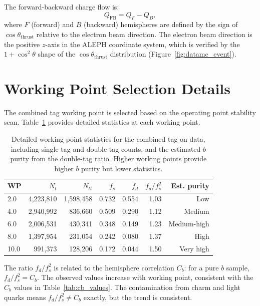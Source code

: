 \documentclass[11pt,a4paper]{article}
\begin{document}
The forward-backward charge flow is:
\begin{equation}
Q_\mathrm{FB} = Q_F - Q_B,
\label{eq:qfb_definition}
\end{equation}
where $F$ (forward) and $B$ (backward) hemispheres are defined by the sign of
$\cos\theta_\mathrm{thrust}$ relative to the electron beam direction. The electron
beam direction is the positive $z$-axis in the ALEPH coordinate system, which is
verified by the $1 + \cos^2\theta$ shape of the $\cos\theta_\mathrm{thrust}$
distribution (Figure~\ref{fig:datamc_event}).

\section{Working Point Selection Details}
\label{app:working_point}

The combined tag working point is selected based on the operating point stability
scan. Table~\ref{tab:wp_detail} provides detailed statistics at each working point.

\begin{table}[htbp]
\centering
\caption{Detailed working point statistics for the combined tag on data, including
single-tag and double-tag counts, and the estimated $b$ purity from the double-tag
ratio. Higher working points provide higher $b$ purity but lower statistics.}
\label{tab:wp_detail}
\begin{tabular}{lrrrrrr}
\toprule
WP & $N_t$ & $N_{tt}$ & $f_s$ & $f_d$ & $f_d/f_s^2$ & Est. purity \\
\midrule
2.0 & 4,223,810 & 1,598,458 & 0.732 & 0.554 & 1.03 & Low \\
4.0 & 2,940,992 & 836,660 & 0.509 & 0.290 & 1.12 & Medium \\
6.0 & 2,006,531 & 430,341 & 0.348 & 0.149 & 1.23 & Medium-high \\
8.0 & 1,397,954 & 231,054 & 0.242 & 0.080 & 1.37 & High \\
10.0 & 991,373 & 128,206 & 0.172 & 0.044 & 1.50 & Very high \\
\bottomrule
\end{tabular}
\end{table}

The ratio $f_d / f_s^2$ is related to the hemisphere correlation $C_b$: for a pure $b$
sample, $f_d / f_s^2 = C_b$. The observed values increase with working point, consistent
with the $C_b$ values in Table~\ref{tab:cb_values}. The contamination from charm and
light quarks means $f_d / f_s^2 \neq C_b$ exactly, but the trend is consistent.
\end{document}

